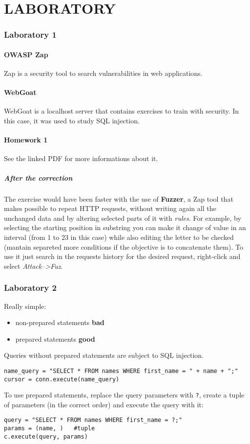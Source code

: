 \documentclass[a4paper, 10pt, titlepage]{article}
\begin{document}
\newpage	
\part{LABORATORY}
\newpage
\section{Laboratory 1}
\subsection{OWASP Zap}
Zap is a security tool to search vulnerabilities in web applications.
\subsection{WebGoat}
WebGoat is a localhost server that contains exercises to train with security. In this case, it was used to study SQL injection.
\subsection{Homework 1}
See the linked PDF for more informations about it. 
\subsubsection{After the correction} 
The exercise would have been faster with the use of \textbf{Fuzzer}, a Zap tool that makes possible to repeat HTTP requests, without writing again all the unchanged data and by altering selected parts of it with \textit{rules}. For example, by selecting the starting position in substring you can make it change of value in an interval (from 1 to 23 in this case) while also editing the letter to be checked (mantain separeted more conditions if the objective is to concatenate them). To use it just search in the requests history for the desired request, right-click and select \textit{Attack-->Fuz}.

\section{Laboratory 2}
Really simple:
\begin{itemize}
\item non-prepared statements \textbf{bad}
\item prepared statements \textbf{good}
\end{itemize}
Queries without prepared statements are subject to SQL injection.
\begin{lstlisting}
name_query = "SELECT * FROM names WHERE first_name = " + name + ";"
cursor = conn.execute(name_query)
\end{lstlisting}
To use prepared statements, replace the query parameters with \lstinline|?|, create a tuple of parameters (in the correct order) and execute the query with it:
\begin{lstlisting}
query = "SELECT * FROM names WHERE first_name = ?;"
params = (name, )	#tuple
c.execute(query, params)
\end{lstlisting}
\end{document}
